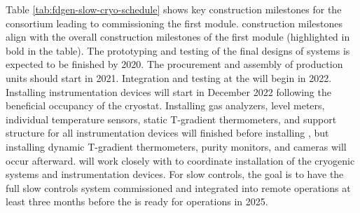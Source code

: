 Table \ref{tab:fdgen-slow-cryo-schedule} shows key construction milestones for the  consortium leading to commissioning the first  module.  construction milestones align with the overall construction milestones of the first  module (highlighted in bold in the table). The prototyping and testing of the final designs of  systems is expected to be finished by 2020. The procurement and assembly of production units should start in 2021. Integration and testing at the  will begin in 2022. Installing instrumentation devices will start in December 2022 following the beneficial occupancy of the cryostat. Installing gas analyzers, level meters, individual temperature sensors, static T-gradient thermometers, and support structure for all instrumentation devices will finished before installing , but installing dynamic T-gradient thermometers, purity monitors, and cameras will occur afterward.  will work closely with  to coordinate installation of the cryogenic systems and instrumentation devices. For slow controls, the goal is to have the full slow controls system commissioned and integrated into remote operations at least three months before the %
 is ready for operations in 2025.  

